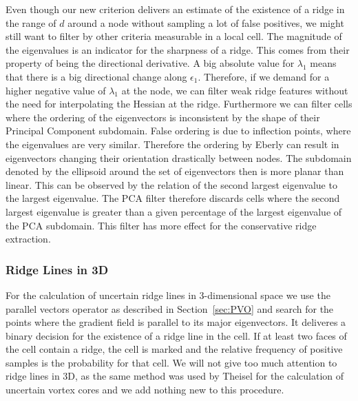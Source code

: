 Even though our new criterion delivers an estimate of the existence of a
ridge in the range of $d$ around a node without sampling a lot of false
positives, we might still want to filter by other criteria measurable in
a local cell. The magnitude of the eigenvalues is an indicator for the
sharpness of a ridge. This comes from their property of being the
directional derivative. A big absolute value for $\lambda_1$ means that
there is a big directional change along $\epsilon_1$. Therefore, if we
demand for a higher negative value of $\lambda_1$ at the node, we can
filter weak ridge features without the need for interpolating the
Hessian at the ridge. Furthermore we can filter cells where the
ordering of the eigenvectors is inconsistent by the shape of their
Principal Component subdomain. False ordering is due to inflection
points, where the eigenvalues are very similar. Therefore the ordering
by Eberly can result in eigenvectors changing their orientation
drastically between nodes. The subdomain denoted by the ellipsoid
around the set of eigenvectors then is more planar than linear. This
can be observed by the relation of the second largest eigenvalue to the
largest eigenvalue. The PCA filter therefore discards cells where the
second largest eigenvalue is greater than a given percentage of the
largest eigenvalue of the PCA subdomain. This filter has more effect for
the conservative ridge extraction.

\subsubsection{Ridge Lines in 3D}

For the calculation of uncertain ridge lines in 3-dimensional space we
use the parallel vectors operator as described in Section~\ref{sec:PVO}
and search for the points where the gradient field is parallel to its
major eigenvectors. It deliveres a binary decision for the existence of
a ridge line in the cell. If at least two faces of the cell contain a
ridge, the cell is marked and the relative frequency of positive
samples is the probability for that cell. We will not give too much
attention to ridge lines in 3D, as the same method was used by Theisel
\etal{} for the calculation of uncertain vortex cores and we add nothing
new to this procedure.